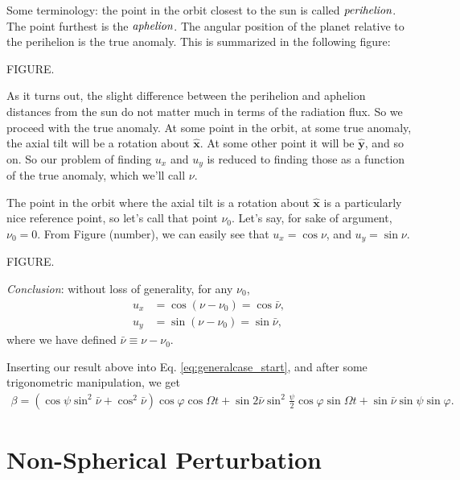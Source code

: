 \documentclass[10pt]{article}
\begin{document}
\vspace{10pt}
Some terminology: the point in the orbit closest to the sun is called $\emph{perihelion}$. The point furthest is the $\emph{aphelion}$. The angular position of the planet relative to the perihelion is the true anomaly. This is summarized in the following figure:

\vspace{10pt}FIGURE.

\vspace{10pt}
As it turns out, the slight difference between the perihelion and aphelion distances from the sun do not matter much in terms of the radiation flux. So we proceed with the true anomaly. At some point in the orbit, at some true anomaly, the axial tilt will be a rotation about $\mathbf{\hat{x}}$. At some other point it will be $\mathbf{\hat{y}}$, and so on. So our problem of finding $u_x$ and $u_y$ is reduced to finding those as a function of the true anomaly, which we'll call $\nu$. 

\vspace{10pt}
The point in the orbit where the axial tilt is a rotation about $\mathbf{\hat{x}}$ is a particularly nice reference point, so let's call that point $\nu_0$. Let's say, for sake of argument, $\nu_0 = 0$. From Figure (number), we can easily see that $u_x = \cos \nu$, and $u_y = \sin \nu$.

\vspace{10pt}FIGURE.

\vspace{10pt}
\emph{Conclusion}: without loss of generality, for any $\nu_0$, 
\begin{align}
u_x &= \cos (\nu - \nu_0) = \cos \bar{\nu}, \\ 
u_y &= \sin (\nu - \nu_0) = \sin \bar{\nu},
\end{align}
where we have defined $\bar{\nu} \equiv \nu - \nu_0$.

\vspace{10pt}
Inserting our result above into Eq. \eqref{eq:generalcase_start}, and after some trigonometric manipulation, we get
\begin{align}
\beta = (\cos \psi \sin^2\bar{\nu} + \cos^2\bar{\nu})\cos \varphi \cos \Omega t + \sin 2\bar{\nu} \sin^2\frac{\psi}{2} \cos \varphi \sin \Omega t + \sin \bar{\nu} \sin \psi \sin \varphi.
\end{align}


\section{Non-Spherical Perturbation}
\end{document}
